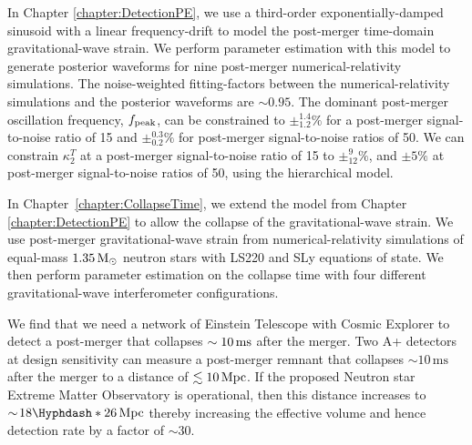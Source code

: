 \documentclass[../Thesis.tex]{subfiles}
\begin{document}
    In Chapter \ref{chapter:DetectionPE}, we use a third-order exponentially-damped sinusoid with a linear frequency-drift to model the post-merger time-domain gravitational-wave strain.
    We perform parameter estimation with this model to generate posterior waveforms for nine post-merger numerical-relativity simulations.
    The  noise-weighted fitting-factors between the numerical-relativity simulations and the posterior waveforms are $\sim 0.95$.
    The dominant post-merger oscillation frequency, $f_{\mathrm{peak}}$, can be constrained to $\pm_{1.2}^{1.4}\%$ for a post-merger signal-to-noise ratio of 15 and $\pm_{0.2}^{0.3}\%$ for post-merger signal-to-noise ratios of 50.
    We can constrain $\kappa_2^T$ at a post-merger signal-to-noise ratio of 15 to $\pm^{9}_{12}\%$, and $\pm 5\%$ at post-merger signal-to-noise ratios of 50,  using the hierarchical model. \par

    In Chapter~\ref{chapter:CollapseTime}, we extend the model from Chapter \ref{chapter:DetectionPE} to allow the collapse of the gravitational-wave strain.
    We use post-merger gravitational-wave strain from numerical-relativity simulations of equal-mass $1.35\,\mathrm{M}_{\odot}$ neutron stars with LS220 and SLy equations of state.
    We then perform parameter estimation on the collapse time with four different gravitational-wave interferometer configurations. \par
    
    We find that we need a network of Einstein Telescope with Cosmic Explorer to detect a post-merger that collapses $\sim10\,\mathrm{ms}$ after the merger.
    Two A+ detectors at design sensitivity can measure a post-merger remnant that collapses $\sim\!10\,\mathrm{ms}$  after the merger to a distance of $\lesssim 10\,\mathrm{Mpc}$.
    If the proposed Neutron star Extreme Matter Observatory is operational, then this distance increases to $\sim\!18\Hyphdash*26\,\Mpc$ thereby increasing the effective volume and hence detection rate by a factor of $\sim 30$.
    
    
    
    

    
\end{document}
